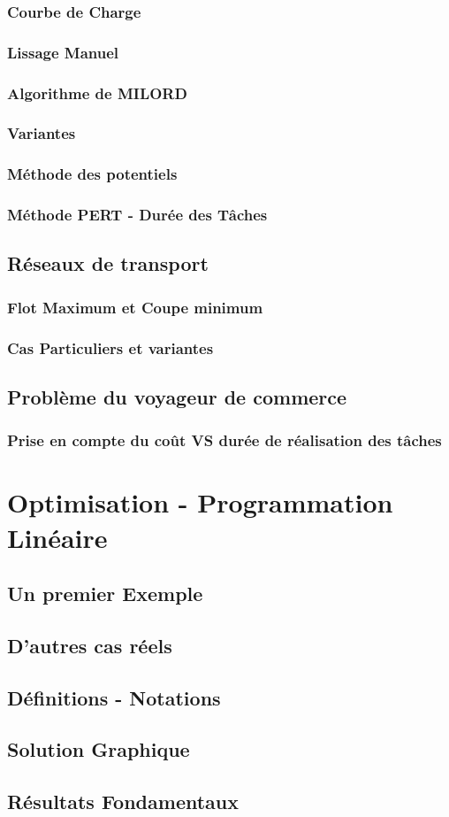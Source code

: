 \subsubsection{Courbe de Charge}
\subsubsection{Lissage Manuel}
\subsubsection{Algorithme de MILORD}
\subsubsection{Variantes}
\subsubsection{Méthode des potentiels}
\subsubsection{Méthode PERT - Durée des Tâches}\label{subsubsec:mpert}

\newpage
\subsection{Réseaux de transport}
\subsubsection{Flot Maximum et Coupe minimum} 
\subsubsection{Cas Particuliers et variantes}
\subsection{Problème du voyageur de commerce}
\subsubsection{Prise en compte du coût VS durée de réalisation des tâches}

\newpage
\section{Optimisation - Programmation Linéaire}\label{sec:optpl}
\subsection{Un premier Exemple}
\subsection{D'autres cas réels}
\subsection{Définitions - Notations}
\subsection{Solution Graphique}
\subsection{Résultats Fondamentaux}